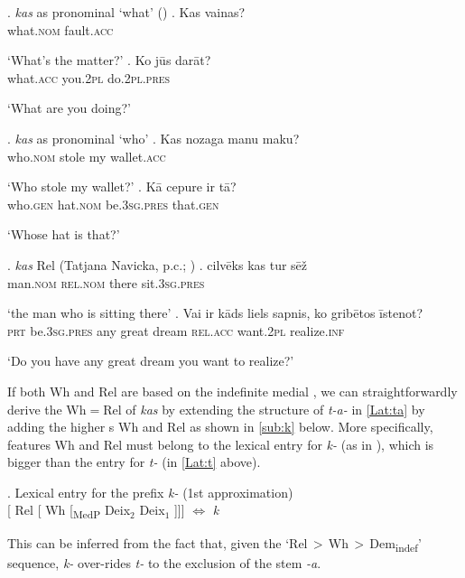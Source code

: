 \ex.  \textit{kas} as pronominal `what' (\citealt{Praulins2012})
\ag. Kas vainas?\\
what.\textsc{nom} fault.\textsc{acc}\\
\strut `What's the matter?'
\bg. Ko j\={u}s dar\={a}t?\\
what.\textsc{acc} you.\textsc{2pl} do.\textsc{2pl.pres}\\
\strut `What are you doing?'

\ex.  \textit{kas} as pronominal `who'
\ag. Kas nozaga manu maku?\\
who.\textsc{nom} stole my wallet.\textsc{acc}\\
\strut `Who stole my wallet?'
\bg. K\={a} cepure ir t\={a}?\label{conc2}\\
who.\textsc{gen} hat.\textsc{nom} be.\textsc{3sg.pres} that.\textsc{gen}\\
\strut `Whose hat is that?'

\ex.   \textit{kas} Rel (Tatjana Navicka, p.c.; \citealt{Nau2009})
\ag. cilv\={e}ks kas tur s\={e}\v{z}\label{conc3}\\
man.\textsc{nom} \textsc{rel.nom} there sit.\textsc{3sg.pres}\\
\strut `the man who is sitting there'
\bg. Vai ir k\={a}ds liels sapnis, ko grib\={e}tos \={i}stenot?\\
\textsc{prt} be.\textsc{3sg.pres} any great dream \textsc{rel.acc} want.\textsc{2pl} realize.\textsc{inf}\\
\strut `Do you have any great dream you want to realize?'

\noindent If both Wh and Rel are based on the indefinite medial , we can straightforwardly derive the Wh$=$Rel  of \textit{kas} by extending the structure of \textit{t-a-} in \ref{Lat:ta} by adding the higher s Wh and Rel as shown in \ref{sub:k} below.  More specifically, features Wh and Rel must belong to the lexical entry for \textit{k-} (as in \Next), which is bigger than the entry for \textit{t-} (in \ref{Lat:t} above). 

\ex. Lexical entry for the  prefix \textit{k-} (1st approximation)\label{old:k}\\[0.5ex]
[ Rel [ Wh [\textsubscript{MedP} Deix$_{2}$ Deix$_{1}$ ]]] $\Leftrightarrow$ \textit{k}

This can be inferred from the fact that, given the `Rel\,$>$\,Wh\,$>$\,Dem\textsubscript{indef}' sequence, \textit{k-} over-rides \textit{t-} to the exclusion of the stem \textit{-a}. 

